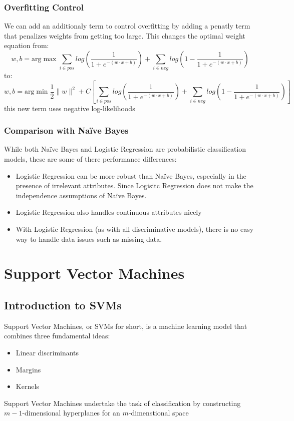 \documentclass[12pt, a4paper]{book}
\begin{document}
\subsection{Overfitting Control}
We can add an additionaly term to control overfitting by adding a penatly term that penalizes weights from getting too large. This changes the optimal weight equation from:
$$w,b = \text{arg}\max\sum_{i \in pos}log\left(\frac{1}{1+e^{-(w\cdot x+b)}}\right)+\sum_{i \in neg}log\left(1-\frac{1}{1+e^{-(w\cdot x + b)}}\right)$$
to:
$$w,b = \text{arg}\min \frac{1}{2}\|w\|^2 + C\left[\sum_{i \in pos}log\left(\frac{1}{1+e^{-(w\cdot x+b)}}\right)+\sum_{i \in neg}log\left(1-\frac{1}{1+e^{-(w\cdot x + b)}}\right)\right]$$
this new term uses negative log-likelihoods

\subsection{Comparison with Naïve Bayes}
While both Naïve Bayes and Logistic Regression are probabilistic classification models, these are some of there performance differences:
\begin{itemize}
    \item Logistic Regression can be more robust than Naïve Bayes, especially in the presence of irrelevant attributes. Since Logisitc Regression does not make the independence assumptions of Naïve Bayes.
    \item Logistic Regression also handles continuous attributes nicely
    \item With Logistic Regression (as with all discriminative models), there is no easy
way to handle data issues such as missing data.
\end{itemize}

\chapter{Support Vector Machines}
\section{Introduction to SVMs}
Support Vector Machines, or SVMs for short, is a machine learning model that combines three fundamental ideas:
\begin{itemize}
    \item Linear discriminants
    \item Margins
    \item Kernels
\end{itemize}
Support Vector Machines undertake the task of classification by constructing $m-1$-dimensional hyperplanes for an $m$-dimenstional space
\end{document}
